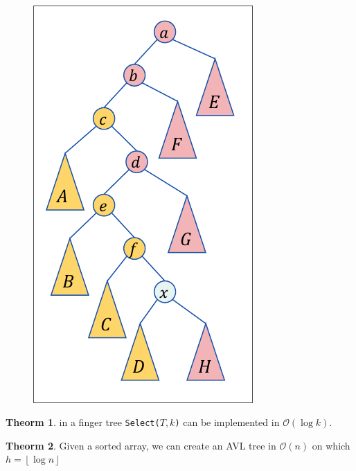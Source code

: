 \documentclass[]{article}
\theoremstyle{definition}
\newtheorem{Theorem}{\color{theoColor}Theorm}
\newcommand\theo  [1] {\begin{Theorem}#1\end{Theorem}}
\newcommand\oc    {\mathcal{O}}
\newcommand\rf    {\right\rfloor}
\newcommand\lf    {\left\lfloor}
\newcommand\floor [1] {\lf #1 \rf}
\newcommand\logn      {\log n}
\begin{document}
\begin{multicols}{4}
				\,\!\vspace{-3em}
				\begin{figure}
					\includegraphics[width=\linewidth]{images/split}\vspace{-1em}
				\end{figure}
				\theo{in a finger tree \texttt{Select($T, k$)} can be implemented in $\oc(\log k)$. }
				\theo{Given a sorted array, we can create an AVL tree in $\oc(n)$ on which $h = \floor{\logn}$}
				


\end{multicols}
\end{document}
